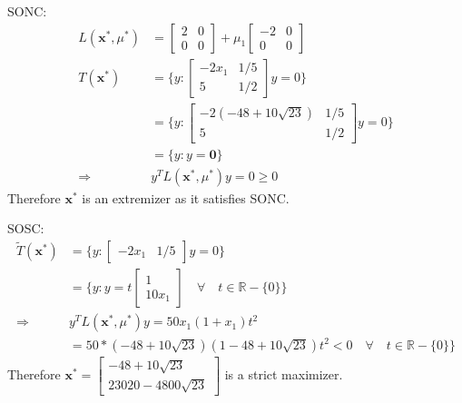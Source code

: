 \documentclass[a4paper,11pt]{article}
\newcommand{\V}[1]{\boldsymbol{#1}}
\newcommand{\mat}[1]{\begin{bmatrix}#1\end{bmatrix}}
\begin{document}
\noindent SONC:
\begin{align*}
 L(\V{x}^*,\mu^*)& = \mat{2&0\\0&0} +\mu_1\mat{-2 & 0\\ 0& 0}\\
 T(\V{x}^*)& = \{y: \mat{-2x_1 & 1/5\\ 5&  1/2}y = 0\}\\
 &= \{y: \mat{-2(-48+10\sqrt{23}) & 1/5\\ 5&  1/2}y = 0\}\\
 & = \{y: y=\V{0}\}\\
 \Rightarrow& y^TL(\V{x}^*,\mu^*)y = 0 \geq 0
\end{align*}
Therefore $\V{x}^*$ is an extremizer as it satisfies SONC.

\noindent SOSC:
\begin{align*}
 \tilde{T}(\V{x}^*)& = \{y: \mat{-2x_1& 1/5}y=0\}\\
 & = \{y: y=t\mat{1\\10x_1} \quad \forall \quad t\in \mathbb{R}-\{0\}\}\\
 \Rightarrow& y^TL(\V{x}^*,\mu^*)y = 50x_1(1+x_1)t^2\\
 & = 50*(-48+10\sqrt{23})(1-48+10\sqrt{23})t^2 < 0 \quad \forall \quad t\in \mathbb{R}-\{0\}\}
\end{align*}
Therefore $\V{x}^*=\mat{-48+10\sqrt{23}\\23020-4800\sqrt{23}}$ is a strict maximizer. 

\clearpage
\end{document}
